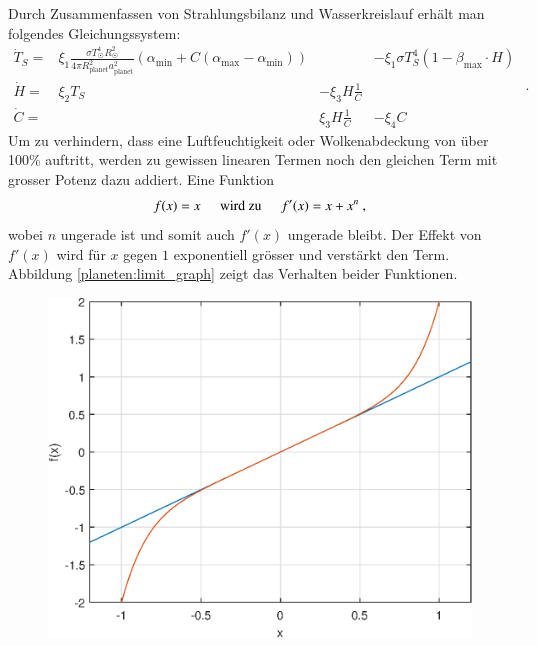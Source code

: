 \begin{refsection}
Durch Zusammenfassen von Strahlungsbilanz und Wasserkreislauf erhält man folgendes Gleichungssystem:
\begin{equation}
\begin{matrix}
\dot{T}_S = & \xi_1 \frac{\sigma T_{\astrosun}^4 R_{\astrosun}^2}{4 \pi R_{\text{planet}}^2 a_{\text{planet}}^2} (\alpha_{\text{min}} + C(\alpha_{\text{max}} - \alpha_{\text{min}})) && - \xi_1 \sigma T_{S}^4  (1 - \beta_{\text{max}} \cdot H)\\
\dot{H}   = & \xi_2 T_S              & - \xi_3 H \frac{1}{C}          & \\
\dot{C}   = &                        &   \xi_3 H \frac{1}{C}          & - \xi_4 C
\end{matrix} \text{ .}
\end{equation}
Um zu verhindern, dass eine Luftfeuchtigkeit oder Wolkenabdeckung von über 100\% auftritt, werden zu gewissen linearen Termen noch den gleichen Term mit grosser Potenz dazu addiert. Eine Funktion
\begin{equation}
f(x) = x \hspace{0.5cm}\text{wird zu}\hspace{0.5cm} f'(x) = x + x^n \text{ ,}
\end{equation}
wobei $n$ ungerade ist und somit auch $f'(x)$ ungerade bleibt. Der Effekt von $f'(x)$ wird für $x$ gegen $1$ exponentiell grösser und verstärkt den Term. Abbildung \ref{planeten:limit_graph} zeigt das Verhalten beider Funktionen.
\begin{figure}[!h]
	\center
	\includegraphics[height=0.45\textheight]{planeten/Matlab/figures/limiter.eps}

\end{figure}
\end{refsection}
